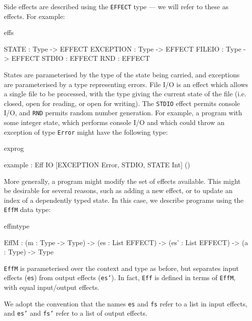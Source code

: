 Side effects are described using the \texttt{EFFECT} type --- we will refer
to these as  effects. For example:

\begin{SaveVerbatim}{effs}

STATE     : Type -> EFFECT
EXCEPTION : Type -> EFFECT
FILEIO    : Type -> EFFECT
STDIO     : EFFECT
RND       : EFFECT

\end{SaveVerbatim}

\noindent
States are parameterised by the type of the state being carried, and exceptions
are parameterised by a type representing errors. File I/O is an effect which
allows a single file to be processed, with the type giving the current state
of the file (i.e. closed, open for reading, or open for writing). The
\texttt{STDIO} effect permits console I/O, and \texttt{RND} permits random
number generation.
%
For example, a program with some integer state, which performs console I/O 
and which could throw
an exception of type \texttt{Error} might have the following type:

\noindent
\begin{SaveVerbatim}{exprog}

 example : Eff IO [EXCEPTION Error, STDIO, STATE Int] ()

\end{SaveVerbatim}

\noindent
More generally, a program might modify the set of effects available. This
might be desirable for several reasons, such as adding a new effect, or to
update an index of a dependently typed state. In this case, we describe
programs using the \texttt{EffM} data type:

\begin{SaveVerbatim}{effmtype}

EffM : (m   : Type -> Type) -> 
       (es  : List EFFECT) -> 
       (es' : List EFFECT) -> 
       (a   : Type) -> Type

\end{SaveVerbatim}

\noindent
\texttt{EffM} is parameterised over the context and type as before,
but separates input effects (\texttt{es}) from output effects (\texttt{es'}).
In fact, \texttt{Eff} is defined in terms of \texttt{EffM}, with equal
input/output effects.

We adopt the convention that the names \texttt{es} and \texttt{fs} refer to a list
in input effects, and \texttt{es'} and \texttt{fs'} refer to a list
of output effects.

